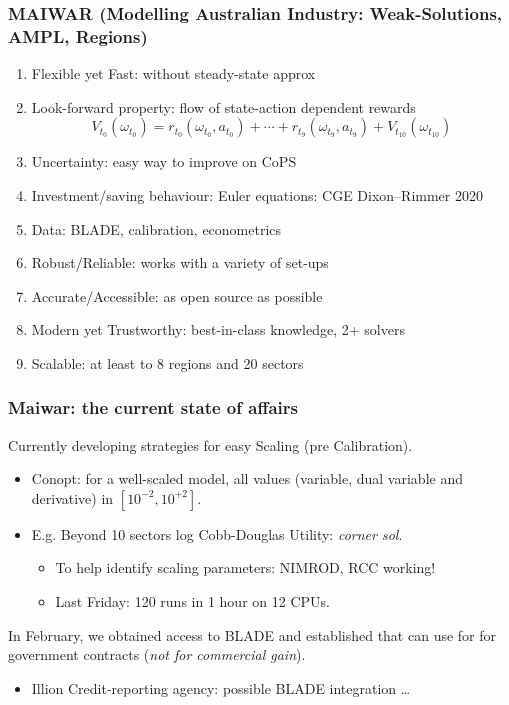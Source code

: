 \documentclass[handout,english]{beamer}
\begin{document}
\begin{frame}
  \frametitle{MAIWAR \small(Modelling Australian Industry: Weak-Solutions, AMPL,
  Regions)}
  \begin{enumerate}\footnotesize
    \item Flexible yet Fast: without steady-state approx
    \item Look-forward property: flow of state-action dependent rewards
  \[
    V_{t_0}(\omega_{t_0}) = r_{t_0}(\omega_{t_0}, a_{t_0}) + \cdots
    + r_{t_9}(\omega_{t_9}, a_{t_9}) + V_{t_{10}}(\omega_{t_{10}})
  \]
    \item Uncertainty: easy way to improve on CoPS
    \item Investment/saving behaviour: Euler equations: CGE Dixon--Rimmer 2020
    \item Data: BLADE, calibration, econometrics
    \item Robust/Reliable: works with a variety of set-ups
    \item Accurate/Accessible: as open source as possible
    \item Modern yet Trustworthy: best-in-class knowledge, 2+ solvers
    \item Scalable: at least to 8 regions and 20 sectors
  \end{enumerate}\normalsize
\end{frame}
\begin{frame}
  \frametitle{Maiwar: the current state of affairs}\thispagestyle{empty}
  Currently developing strategies for easy Scaling (pre Calibration).
    \begin{itemize}
      \item Conopt: for a well-scaled model, all values (variable,
        dual variable and derivative) in $[10^{-2} , 10^{+2}]$.
      \item E.g. Beyond 10 sectors log Cobb-Douglas Utility:
        \emph{corner sol}.
        \begin{itemize}
          \item To help identify scaling parameters: NIMROD, RCC working!
          \item Last Friday: 120 runs in 1 hour on 12 CPUs.
        \end{itemize}
    \end{itemize}

  In February, we obtained access to BLADE and established that can use for
  for government contracts (\emph{not for commercial gain}).
  \begin{itemize}
    \item Illion Credit-reporting agency: possible BLADE integration \dots
  \end{itemize}
\end{frame}
\end{document}
